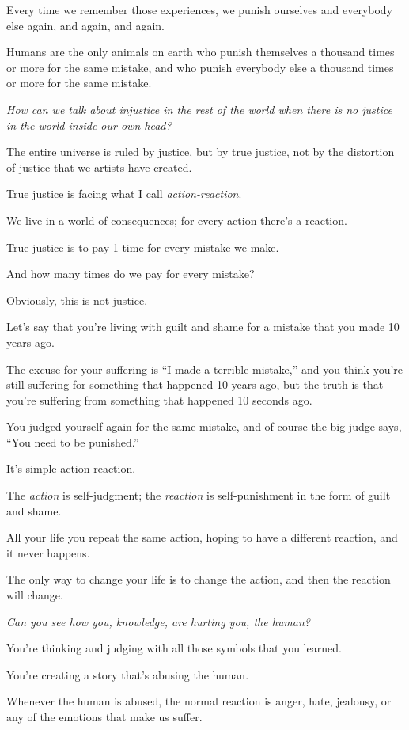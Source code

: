 \documentclass{article}
\numberwithin{equation}{section}
\begin{document}
Every time we remember those experiences, we punish ourselves and everybody else again, and again, and again.

%
Humans are the only animals on earth who punish themselves a thousand times or more for the same mistake, and who punish everybody else a thousand times or more for the same mistake.

\textit{How can we talk about injustice in the rest of the world when there is no justice in the world inside our own head?}

The entire universe is ruled by justice, but by true justice, not by the distortion of justice that we artists have created.

True justice is facing what I call \textit{action-reaction}.

We live in a world of consequences; for every action there's a reaction.

True justice is to pay 1 time for every mistake we make.

And how many times do we pay for every mistake?

Obviously, this is not justice.

%
Let's say that you're living with guilt and shame for a mistake that you made 10 years ago.

The excuse for your suffering is ``I made a terrible mistake,'' and you think you're still suffering for something that happened 10 years ago, but the truth is that you're suffering from something that happened 10 seconds ago.

You judged yourself again for the same mistake, and of course the big judge says, ``You need to be punished.''

It's simple action-reaction.

The \textit{action} is self-judgment; the \textit{reaction} is self-punishment in the form of guilt and shame.

All your life you repeat the same action, hoping to have a different reaction, and it never happens.

The only way to change your life is to change the action, and then the reaction will change.

%
\textit{Can you see how you, knowledge, are hurting you, the human?}

You're thinking and judging with all those symbols that you learned.

You're creating a story that's abusing the human.

Whenever the human is abused, the normal reaction is anger, hate, jealousy, or any of the emotions that make us suffer.
\end{document}
